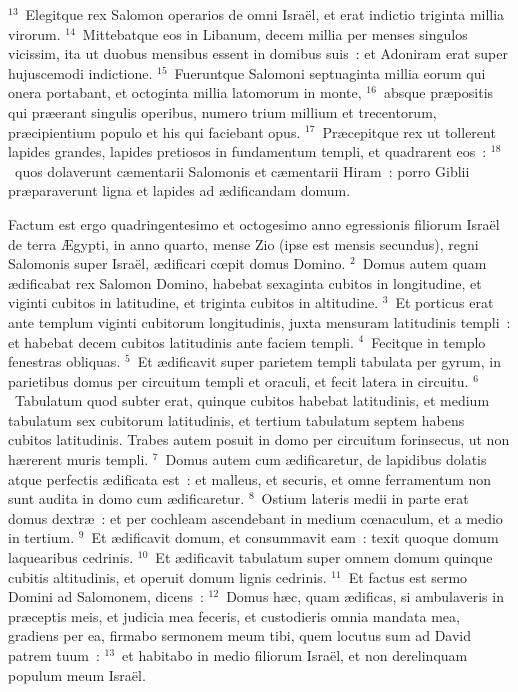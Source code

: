 ${}^{13}$~Elegitque rex Salomon operarios de omni Isra\"el, et erat indictio triginta millia virorum.
${}^{14}$~Mittebatque eos in Libanum, decem millia per menses singulos vicissim, ita ut duobus mensibus essent in domibus suis~: et Adoniram erat super hujuscemodi indictione.
${}^{15}$~Fueruntque Salomoni septuaginta millia eorum qui onera portabant, et octoginta millia latomorum in monte,
${}^{16}$~absque pr\ae positis qui pr\ae erant singulis operibus, numero trium millium et trecentorum, pr\ae cipientium populo et his qui faciebant opus.
${}^{17}$~Pr\ae cepitque rex ut tollerent lapides grandes, lapides pretiosos in fundamentum templi, et quadrarent eos~:
${}^{18}$~quos dolaverunt c\ae mentarii Salomonis et c\ae mentarii Hiram~: porro Giblii pr\ae paraverunt ligna et lapides ad \ae dificandam domum.

\bchapter
\lettrine[lines=3,image=true,loversize=0.05,lraise=-0.03]{F}{}actum est ergo quadringentesimo et octogesimo anno egressionis filiorum Isra\"el de terra \AE gypti, in anno quarto, mense Zio (ipse est mensis secundus), regni Salomonis super Isra\"el, \ae dificari cœpit domus Domino.
${}^{2}$~Domus autem quam \ae dificabat rex Salomon Domino, habebat sexaginta cubitos in longitudine, et viginti cubitos in latitudine, et triginta cubitos in altitudine.
${}^{3}$~Et porticus erat ante templum viginti cubitorum longitudinis, juxta mensuram latitudinis templi~: et habebat decem cubitos latitudinis ante faciem templi.
${}^{4}$~Fecitque in templo fenestras obliquas.
${}^{5}$~Et \ae dificavit super parietem templi tabulata per gyrum, in parietibus domus per circuitum templi et oraculi, et fecit latera in circuitu.
${}^{6}$~Tabulatum quod subter erat, quinque cubitos habebat latitudinis, et medium tabulatum sex cubitorum latitudinis, et tertium tabulatum septem habens cubitos latitudinis. Trabes autem posuit in domo per circuitum forinsecus, ut non h\ae rerent muris templi.
${}^{7}$~Domus autem cum \ae dificaretur, de lapidibus dolatis atque perfectis \ae dificata est~: et malleus, et securis, et omne ferramentum non sunt audita in domo cum \ae dificaretur.
${}^{8}$~Ostium lateris medii in parte erat domus dextr\ae~: et per cochleam ascendebant in medium cœnaculum, et a medio in tertium.
${}^{9}$~Et \ae dificavit domum, et consummavit eam~: texit quoque domum laquearibus cedrinis.
${}^{10}$~Et \ae dificavit tabulatum super omnem domum quinque cubitis altitudinis, et operuit domum lignis cedrinis.
${}^{11}$~Et factus est sermo Domini ad Salomonem, dicens~:
${}^{12}$~Domus h\ae c, quam \ae dificas, si ambulaveris in pr\ae ceptis meis, et judicia mea feceris, et custodieris omnia mandata mea, gradiens per ea, firmabo sermonem meum tibi, quem locutus sum ad David patrem tuum~:
${}^{13}$~et habitabo in medio filiorum Isra\"el, et non derelinquam populum meum Isra\"el.


